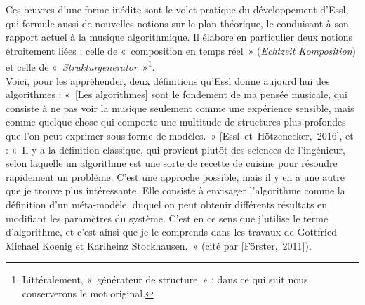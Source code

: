 \documentclass[a4paper,12pt]{article}
\newcommand{\guill}[1]{«~#1~»}
\newcommand{\cicite}[1]{{\footnotesize[#1]}}
\begin{document}
Ces œuvres d'une forme inédite sont le volet pratique du développement d'Essl, qui formule aussi de nouvelles notions sur le plan théorique, le conduisant à son rapport actuel à la musique algorithmique. Il élabore en particulier deux notions étroitement liées : celle de \guill{composition en temps réel} (\emph{Echtzeit Komposition}) et celle de \guill{\emph{Strukturgenerator}}\footnote{Littéralement, \guill{générateur de structure} ; dans ce qui suit nous conserverons le mot original.}. \\
Voici, pour les appréhender, deux définitions qu'Essl donne aujourd'hui des algorithmes : \guill{[Les algorithmes] sont le fondement de ma pensée musicale, qui consiste à ne pas voir la musique seulement comme une expérience sensible, mais comme quelque chose qui comporte une multitude de structures plus profondes que l'on peut exprimer sous forme de modèles.} \cicite{Essl~et~Hötzenecker,~2016}, et : \guill{Il y a la définition classique, qui provient plutôt des sciences de l'ingénieur, selon laquelle un algorithme est une sorte de recette de cuisine pour résoudre rapidement un problème. C'est une approche possible, mais il y en a une autre que je trouve plus intéressante. Elle consiste à envisager l'algorithme comme la définition d'un méta-modèle, duquel on peut obtenir différents résultats en modifiant les paramètres du système. C'est en ce sens que j'utilise le terme d'algorithme, et c'est ainsi que je le comprends dans les travaux de Gottfried Michael Koenig et Karlheinz Stockhausen.} (cité par \cicite{Förster,~2011}). \\
\end{document}
